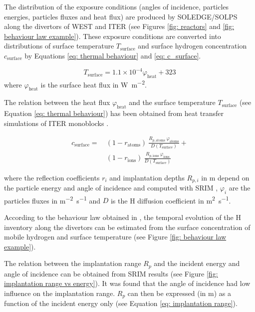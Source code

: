 The distribution of the exposure conditions (angles of incidence, particles energies, particles fluxes and heat flux) are produced by SOLEDGE/SOLPS along the divertors of WEST and ITER (see Figures \ref{fig: reactors} and \ref{fig: behaviour law example}).
These exposure conditions are converted into distributions of surface temperature $T_\mathrm{surface}$ and surface hydrogen concentration $c_\mathrm{surface}$ by Equations \eqref{eq: thermal behaviour} and \eqref{eq: c_surface}.

\begin{equation}
    T_\mathrm{surface} = 1.1\times 10^{-4} \varphi_\mathrm{heat} + 323
    \label{eq: thermal behaviour}
\end{equation}
where $\varphi_\mathrm{heat}$ is the surface heat flux in \si{W.m^{-2}}.

The relation between the heat flux $\varphi_\mathrm{heat}$ and the surface temperature $T_\mathrm{surface}$ (see Equation \eqref{eq: thermal behaviour}) has been obtained from heat transfer simulations of ITER monoblocks \cite{delaporte-mathurin_parametric_2020}.

\begin{align}
    \label{eq: c_surface}
    c_\mathrm{surface} = \ &(1 - r_\mathrm{atoms}) \ \frac{R_{p, \mathrm{atoms}} \ \varphi_\mathrm{atoms}}{D(T_\mathrm{surface})} + \\ &(1 - r_\mathrm{ions}) \nonumber \ \frac{R_{p, \mathrm{ions}} \ \varphi_\mathrm{ions}}{D(T_\mathrm{surface})}
\end{align}

where the reflection coefficients $r_i$ and implantation depths $R_{p, i}$ in \si{m} depend on the particle energy and angle of incidence and computed with SRIM \cite{ziegler_srim_2010}, $\varphi_{i}$ are the particles fluxes in \si{m^{-2}.s^{-1}} and $D$ is the H diffusion coefficient in \si{m^{2}.s^{-1}}.


According to the behaviour law obtained in \cite{delaporte-mathurin_parametric_2020}, the temporal evolution of the H inventory along the divertors can be estimated from the surface concentration of mobile hydrogen and surface temperature (see Figure \ref{fig: behaviour law example}).



The relation between the implantation range $R_p$ and the incident energy and angle of incidence can be obtained from SRIM \cite{ziegler_srim_2010} results (see Figure \ref{fig: implantation range vs energy}).
It was found that the angle of incidence had low influence on the implantation range.
$R_p$ can then be expressed (in \si{m}) as a function of the incident energy only (see Equation \eqref{eq: implantation range}).

